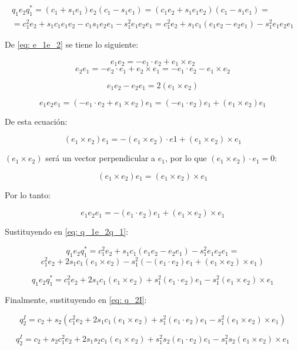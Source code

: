 \documentclass[10pt, a4paper]{report}
\begin{document}
\begin{multline} \label{eq: q_1e_2q_1}
q_1e_2q_1^* = (c_1 + s_1e_1)e_2(c_1 - s_1e_1) = (c_1e_2 + s_1e_1e_2)(c_1 - s_1e_1) = \\
= c_1^2e_2 + s_1c_1e_1e_2 - c_1s_1e_2e_1 - s_1^2e_1e_2e_1 = c_1^2e_2 + s_1c_1(e_1e_2 - e_2e_1) - s_1^2e_1e_2e_1
\end{multline}

De \eqref{eq: e_1e_2} se tiene lo siguiente:

$$ e_1e_2 = -e_1 \cdot e_2 + e_1 \times e_2 $$
$$ e_2e_1 = -e_2 \cdot e_1 + e_2 \times e_1 = -e_1 \cdot e_2 - e_1 \times e_2 $$

\begin{equation} \label{eq: e_1e_2}
e_1 e_2 - e_2 e_1 = 2(e_1 \times e_2)
\end{equation}

$$ e_1 e_2 e_1 = (-e_1 \cdot e_2 + e_1 \times e_2)e_1 =(-e_1 \cdot e_2)e_1 + (e_1 \times e_2)e_1 $$

De esta ecuación:

$$ (e_1 \times e_2)e_1 = -(e_1 \times e_2) \cdot e1 + (e_1 \times e_2) \times e_1 $$

$(e_1 \times e_2)$ será un vector perpendicular a $e_1$, por lo que $(e_1 \times e_2) \cdot e_1 = 0$:

$$ (e_1 \times e_2)e_1 = (e_1 \times e_2) \times e_1 $$

Por lo tanto:

\begin{equation} \label{eq: e_1e_2e_1}
e_1 e_2 e_1 = -(e_1 \cdot e_2)e_1 + (e_1 \times e_2) \times e_1
\end{equation}

Sustituyendo en \eqref{eq: q_1e_2q_1}:

$$ q_1e_2q_1^* = c_1^2e_2 + s_1c_1(e_1e_2 - e_2e_1) - s_1^2e_1e_2e_1 = $$
$$ c_1^2e_2 + 2s_1c_1(e_1 \times e_2) - s_1^2(-(e_1 \cdot e_2)e_1 + (e_1 \times e_2) \times e_1) $$

\begin{equation}
q_1e_2q_1^* = c_1^2e_2 + 2s_1c_1(e_1 \times e_2) + s_1^2(e_1 \cdot e_2)e_1 - s_1^2(e_1 \times e_2) \times e_1
\end{equation}

Finalmente, sustituyendo en \eqref{eq: q_2I}:

$$ q_2^I = c_2 + s_2(c_1^2e_2 + 2s_1c_1(e_1 \times e_2) + s_1^2(e_1 \cdot e_2)e_1 - s_1^2(e_1 \times e_2) \times e_1) $$

\begin{equation} \label{eq: E02}
q_2^I = c_2 + s_2c_1^2e_2 + 2s_1s_2c_1(e_1 \times e_2) + s_1^2s_2(e_1 \cdot e_2)e_1 - s_1^2s_2(e_1 \times e_2) \times e_1
\end{equation}
\end{document}
